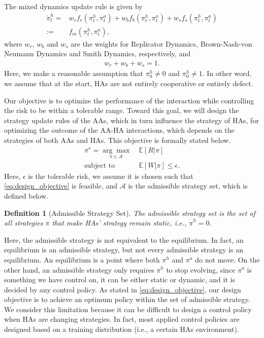 \documentclass[letterpaper]{article} %
\newcommand{\ie}{\textit{i.e., }}
\newtheorem{definition}{Definition}
\begin{document}
The mixed dynamics update rule is given by
\begin{align}
\label{eq:mixed_update_rule}
    \dot{\pi}^h_t=&w_rf_r(\pi^h_t,\pi^a_t)+w_bf_b(\pi^h_t,\pi^a_t)+w_sf_s(\pi^h_t,\pi^a_t)\nonumber\\
    :=&f_m(\pi^h_t,\pi^a_t),
\end{align}
where $w_r$, $w_b$ and $w_s$ are the weights for Replicator Dynamics, Brown-Nash-von Neumann Dynamics and Smith Dynamics, respectively, and
\begin{align}
    w_r+w_b+w_s=1.
\end{align}
Here, we make a reasonable assumption that $\pi^h_0\neq 0$ and $\pi^h_0\neq 1$. In other word, we assume that at the start, HAs are not entirely cooperative or entirely defect.



Our objective is to optimize the performance of the interaction while controlling the risk to be within a tolerable range. Toward this goal, we will design the strategy update rules of the AAs, which in turn influence the strategy of HAs, for optimizing the outcome of the AA-HA interactions, which depends on the strategies of both AAs and HAs. This objective is formally stated below.
\begin{align}
\label{eq:design_objective}
    \pi^\star=\underset{\pi\in\mathcal{A}}{\arg\max}\ &\mathbb{E}[R|\pi]\\
    \textrm{subject to }&\mathbb{E}[W|\pi]\leq \epsilon.\nonumber
\end{align}
Here, $\epsilon$ is the tolerable risk, we assume it is chosen such that \eqref{eq:design_objective} is feasible, and $\mathcal{A}$ is the admissible strategy set, which is defined below.
\begin{definition}[Admissible Strategy Set]
\label{def:admissible_strategy}
The admissible strategy set is the set of all strategies $\pi$ that make HAs' strategy remain static, \ie $\dot{\pi}^h=0$.
\end{definition}
Here, the admissible strategy is not equivalent to the equilibrium. In fact, an equilibrium is an admissible strategy, but not every admissible strategy is an equilibrium. An equilibrium is a point where both $\pi^h$ and $\pi^a$ do not move. On the other hand, an admissible strategy only requires $\pi^h$ to stop evolving, since $\pi^a$ is something we have control on, it can be either static or dynamic, and it is decided by any control policy. As stated in \eqref{eq:design_objective}, our design objective is to achieve an optimum policy within the set of admissible strategy. We consider this limitation because it can be difficult to design a control policy when HAs are changing strategies. In fact, most applied control policies are designed based on a training distribution (i.e., a certain HAs environment).
\end{document}
